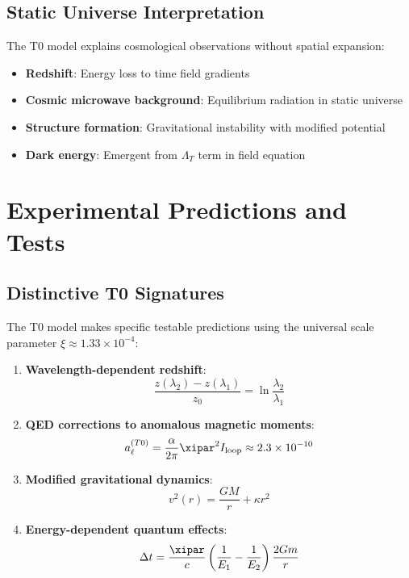 
	\subsection{Static Universe Interpretation}
	\label{subsec:static_universe}
	
	The T0 model explains cosmological observations without spatial expansion:
	\begin{itemize}
		\item \textbf{Redshift}: Energy loss to time field gradients
		\item \textbf{Cosmic microwave background}: Equilibrium radiation in static universe
		\item \textbf{Structure formation}: Gravitational instability with modified potential
		\item \textbf{Dark energy}: Emergent from $\Lambda_T$ term in field equation
	\end{itemize}
	
	\section{Experimental Predictions and Tests}
	\label{sec:experimental_predictions}
	
	\subsection{Distinctive T0 Signatures}
	\label{subsec:distinctive_signatures}
	
	The T0 model makes specific testable predictions using the universal scale parameter $\xi \approx 1.33 \times 10^{-4}$:
	
	\begin{enumerate}
		\item \textbf{Wavelength-dependent redshift}:
		\begin{equation}
			\frac{z(\lambda_2) - z(\lambda_1)}{z_0} = \ln\frac{\lambda_2}{\lambda_1}
			\label{eq:wavelength_test}
		\end{equation}
		
		\item \textbf{QED corrections to anomalous magnetic moments}:
		\begin{equation}
			a_{\ell}^{(T0)} = \frac{\alpha}{2\pi} \xipar^2 I_{\text{loop}} \approx 2.3 \times 10^{-10}
			\label{eq:qed_correction}
		\end{equation}
		
		\item \textbf{Modified gravitational dynamics}:
		\begin{equation}
			v^2(r) = \frac{GM}{r} + \kappa r^2
			\label{eq:rotation_curve_prediction}
		\end{equation}
		
		\item \textbf{Energy-dependent quantum effects}:
		\begin{equation}
			\Delta t = \frac{\xipar}{c} \left(\frac{1}{E_1} - \frac{1}{E_2}\right) \frac{2Gm}{r}
			\label{eq:quantum_time_delay}
		\end{equation}
	\end{enumerate}
	
